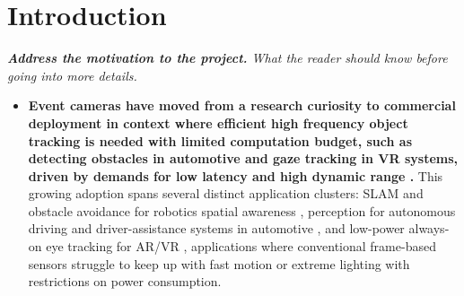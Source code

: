 
\section{Introduction}

\textit{\textbf{Address the motivation to the project.} What the reader should know before going into more details.}

\begin{itemize}
  \item \textbf{Event cameras have moved from a research curiosity to commercial deployment in context where efficient  high frequency object tracking is needed with limited computation budget, such as detecting obstacles in automotive and gaze tracking in VR systems, driven by demands for low latency and high dynamic range \cite{gallego2022event}.} This growing adoption spans several distinct application clusters: SLAM and obstacle avoidance for robotics spatial awareness \cite{vidal2018ultimate}, perception for autonomous driving and driver-assistance systems in automotive \cite{maqueda2018steering}, and low-power always-on eye tracking for AR/VR \cite{angelopoulos2021gaze}, applications where conventional frame-based sensors struggle to keep up with fast motion or extreme lighting with restrictions on power consumption.

  



\end{itemize}
